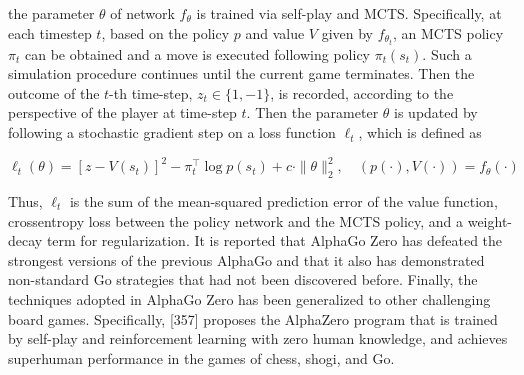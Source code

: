 \documentclass[10pt]{article}
\begin{document}
the parameter $\theta$ of network $f_{\theta}$ is trained via self-play and MCTS. Specifically, at each timestep $t$, based on the policy $p$ and value $V$ given by $f_{\theta_{t}}$, an MCTS policy $\pi_{t}$ can be obtained and a move is executed following policy $\pi_{t}\left(s_{t}\right)$. Such a simulation procedure continues until the current game terminates. Then the outcome of the $t$-th time-step, $z_{t} \in\{1,-1\}$, is recorded, according to the perspective of the player at time-step $t$. Then the parameter $\theta$ is updated by following a stochastic gradient step on a loss function $\ell_{t}$, which is defined as

\[
\ell_{t}(\theta)=\left[z-V\left(s_{t}\right)\right]^{2}-\pi_{t}^{\top} \log p\left(s_{t}\right)+c \cdot\|\theta\|_{2}^{2}, \quad(p(\cdot), V(\cdot))=f_{\theta}(\cdot)
\]

Thus, $\ell_{t}$ is the sum of the mean-squared prediction error of the value function, crossentropy loss between the policy network and the MCTS policy, and a weight-decay term for regularization. It is reported that AlphaGo Zero has defeated the strongest versions of the previous AlphaGo and that it also has demonstrated non-standard Go strategies that had not been discovered before. Finally, the techniques adopted in AlphaGo Zero has been generalized to other challenging board games. Specifically, [357] proposes the AlphaZero program that is trained by self-play and reinforcement learning with zero human knowledge, and achieves superhuman performance in the games of chess, shogi, and Go.
\end{document}
